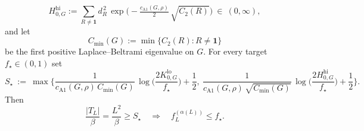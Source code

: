 \begin{proposition}
\begin{equation}
\end{equation}
\begin{equation}\label{eq:H0hi_def}
 H^{\mathrm{hi}}_{0,G}:=\sum_{R\neq\mathbf 1} d_R^{\,2}\,\exp\!\Big(-\tfrac{c_{\mathrm{A1}}(G,\rho)}{2}\,\sqrt{C_2(R)}\Big)
 \ \in\ (0,\infty),
\end{equation}
and let
\[
C_{\min}(G):=\min\{C_2(R):R\neq\mathbf 1\}
\]
be the first positive Laplace--Beltrami eigenvalue on $G$.
For every target $f_{\star}\in(0,1)$ set
\begin{equation}\label{eq:TBmix_Sstar_def_G}
 S_\star\ :=\ \max\!\Bigg\{
 \frac{1}{c_{\mathrm{A1}}(G,\rho)\,C_{\min}(G)}\,\log\!\Big(\frac{2K^{\mathrm{lo}}_{0,G}}{f_\star}\Big)+\frac12,\ 
 \frac{1}{c_{\mathrm{A1}}(G,\rho)\,\sqrt{C_{\min}(G)}}\,\log\!\Big(\frac{2H^{\mathrm{hi}}_{0,G}}{f_\star}\Big)+\frac12
 \Bigg\}.
\end{equation}
Then
\[
\frac{|T_L|}{\beta}=\frac{L^2}{\beta}\ge S_\star
\quad\Longrightarrow\quad
f_L^{(\alpha(L))}\le f_\star.
\]
\end{proposition}

